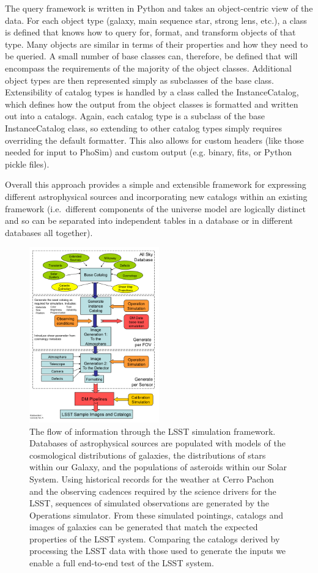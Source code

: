 \documentclass[]{article}
\begin{document}
The query framework is written in Python and takes an object-centric
view of the data.  For each object type (galaxy, main sequence star,
strong lens, etc.), a class is defined that knows how to query for,
format, and transform objects of that type.  Many objects are similar
in terms of their properties and how they need to be queried.  A small
number of base classes can, therefore, be defined that will encompass
the requirements of the majority of the object classes.  Additional
object types are then represented simply as subclasses of the base
class. Extensibility of catalog types is handled by a class called the
InstanceCatalog, which defines how the output from the object classes
is formatted and written out into a catalogs.  Again, each catalog
type is a subclass of the base InstanceCatalog class, so extending to
other catalog types simply requires overriding the default formatter.
This also allows for custom headers (like those needed for input to
PhoSim) and custom output (e.g. binary, fits, or Python pickle files).

Overall this approach provides a simple and extensible framework for
expressing different astrophysical sources and incorporating new
catalogs within an existing framework (i.e.\ different components of
the universe model are logically distinct and so can be separated into
independent tables in a database or in different databases all
together).

\begin{figure}[h]
\centerline{\includegraphics[width=0.5\textwidth]{validation_figures/flow.png}}
\caption{The flow of information through the LSST simulation
 framework. Databases of astrophysical sources are populated with
 models of the cosmological distributions of galaxies, the
 distributions of stars within our Galaxy, and the populations of
 asteroids within our Solar System. Using historical records for the
 weather at Cerro Pachon and the observing cadences required by the
 science drivers for the LSST, sequences of simulated observations
 are generated by the Operations simulator. From these simulated
 pointings, catalogs and images of galaxies can be generated that
 match the expected properties of the LSST system. Comparing the
 catalogs derived by processing the LSST data with those used to
 generate the inputs we enable a full end-to-end test of the LSST
 system.}
\label{fig:flow}       %
\end{figure}
\end{document}
